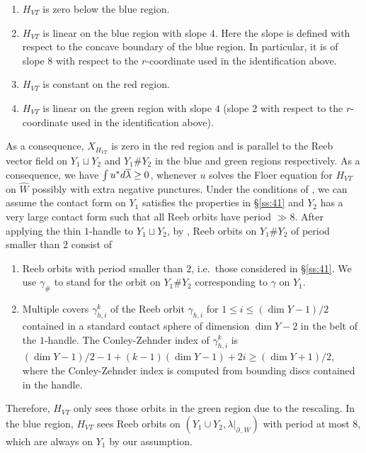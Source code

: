 \documentclass[reqno,11pt]{amsart}
\numberwithin{equation}{section}
\def\rd{{\rm d}}
\begin{document}
\begin{enumerate}
    \item $H_{VT}$ is zero below the blue region.
    \item $H_{VT}$ is linear on the blue region with slope $4$. Here the slope is defined with respect to the concave boundary of the blue region. In particular, it is of slope $8$ with respect to the $r$-coordinate used in the identification above.
    \item $H_{VT}$ is constant on the red region.
    \item $H_{VT}$ is linear on the green region with slope $4$ (slope $2$ with respect to the $r$-coordinate used in the identification above).
\end{enumerate}
As a consequence, $X_{H_{VT}}$ is zero in the red region and is parallel to the Reeb vector field on $Y_1\sqcup Y_2$ and $Y_1\#Y_2$ in the blue and green regions respectively. As a consequence, we have $\int u^*\rd \overline{\lambda} \ge 0$, whenever $u$ solves the Floer equation for $H_{VT}$ on $\widehat{W}$ possibly with extra negative punctures. Under the conditions of , we can assume the contact form on $Y_1$ satisfies the properties in \S \ref{ss:41} and $Y_2$ has a very large contact form such that all Reeb orbits have period $\gg 8$. After applying the thin $1$-handle to $Y_1\sqcup Y_2$, by \cite[Lemma 4.3]{bowden2022making}, Reeb orbits on $Y_1\#Y_2$ of period smaller than $2$ consist of
\begin{enumerate}
    \item Reeb orbits with period smaller than $2$, i.e.\ those considered in  \S \ref{ss:41}. We use $\gamma_{\#}$ to stand for the orbit on $Y_1\#Y_2$ corresponding to $\gamma$ on $Y_1$. 
    \item Multiple covers $\gamma_{h,i}^k$ of the Reeb orbit $\gamma_{h,i}$ for $1\le i \le (\dim Y-1)/2$ contained in a standard contact sphere of dimension $\dim Y-2$ in the belt of the $1$-handle.
    The Conley-Zehnder index of $\gamma_{h,i}^k$ is $(\dim Y-1)/2-1+(k-1)(\dim Y-1)+2i \ge (\dim Y+1)/2$, where the Conley-Zehnder index is computed from bounding discs contained in the handle.
\end{enumerate}
Therefore, $H_{VT}$ only sees those orbits in the green region due to the rescaling. In the blue region, $H_{VT}$ sees Reeb orbits on $(Y_1\cup Y_2,\lambda|_{\partial_-W})$ with period at most $8$, which are always on $Y_1$ by our assumption. 
\end{document}

